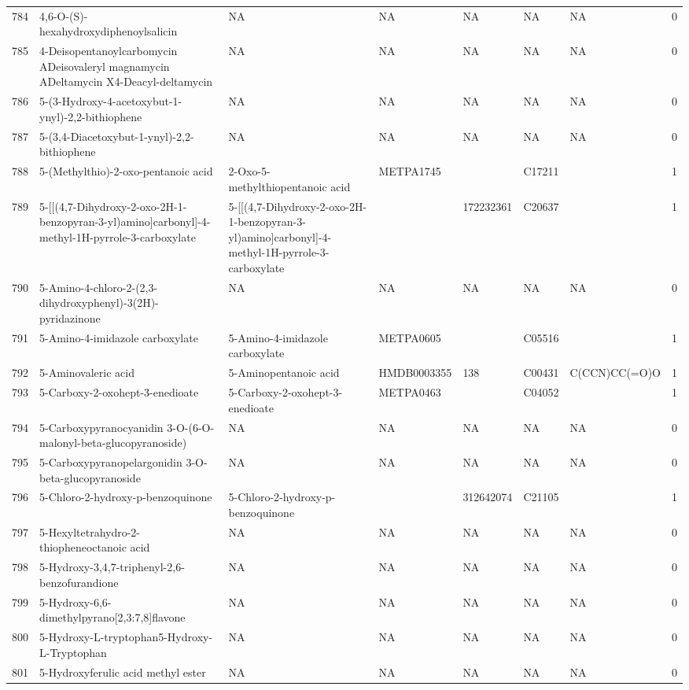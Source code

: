 \documentclass[a4paper]{article}
\begin{document}
\begin{longtable}{rlllllll}
  784 & 4,6-O-(S)-hexahydroxydiphenoylsalicin & NA & NA & NA & NA & NA & 0 \\ 
  785 & 4-Deisopentanoylcarbomycin ADeisovaleryl magnamycin ADeltamycin X4-Deacyl-deltamycin & NA & NA & NA & NA & NA & 0 \\ 
  786 & 5-(3-Hydroxy-4-acetoxybut-1-ynyl)-2,2-bithiophene & NA & NA & NA & NA & NA & 0 \\ 
  787 & 5-(3,4-Diacetoxybut-1-ynyl)-2,2-bithiophene & NA & NA & NA & NA & NA & 0 \\ 
  788 & 5-(Methylthio)-2-oxo-pentanoic acid & 2-Oxo-5-methylthiopentanoic acid & METPA1745 &  & C17211 &  & 1 \\ 
  789 & 5-[[(4,7-Dihydroxy-2-oxo-2H-1-benzopyran-3-yl)amino]carbonyl]-4-methyl-1H-pyrrole-3-carboxylate & 5-[[(4,7-Dihydroxy-2-oxo-2H-1-benzopyran-3-yl)amino]carbonyl]-4-methyl-1H-pyrrole-3-carboxylate &  & 172232361 & C20637 &  & 1 \\ 
  790 & 5-Amino-4-chloro-2-(2,3-dihydroxyphenyl)-3(2H)-pyridazinone & NA & NA & NA & NA & NA & 0 \\ 
  791 & 5-Amino-4-imidazole carboxylate & 5-Amino-4-imidazole carboxylate & METPA0605 &  & C05516 &  & 1 \\ 
  792 & 5-Aminovaleric acid & 5-Aminopentanoic acid & HMDB0003355 & 138 & C00431 & C(CCN)CC(=O)O & 1 \\ 
  793 & 5-Carboxy-2-oxohept-3-enedioate & 5-Carboxy-2-oxohept-3-enedioate & METPA0463 &  & C04052 &  & 1 \\ 
  794 & 5-Carboxypyranocyanidin 3-O-(6-O-malonyl-beta-glucopyranoside) & NA & NA & NA & NA & NA & 0 \\ 
  795 & 5-Carboxypyranopelargonidin 3-O-beta-glucopyranoside & NA & NA & NA & NA & NA & 0 \\ 
  796 & 5-Chloro-2-hydroxy-p-benzoquinone & 5-Chloro-2-hydroxy-p-benzoquinone &  & 312642074 & C21105 &  & 1 \\ 
  797 & 5-Hexyltetrahydro-2-thiopheneoctanoic acid & NA & NA & NA & NA & NA & 0 \\ 
  798 & 5-Hydroxy-3,4,7-triphenyl-2,6-benzofurandione & NA & NA & NA & NA & NA & 0 \\ 
  799 & 5-Hydroxy-6,6-dimethylpyrano[2,3:7,8]flavone & NA & NA & NA & NA & NA & 0 \\ 
  800 & 5-Hydroxy-L-tryptophan5-Hydroxy-L-Tryptophan & NA & NA & NA & NA & NA & 0 \\ 
  801 & 5-Hydroxyferulic acid methyl ester & NA & NA & NA & NA & NA & 0 \\ 

\end{longtable}
\end{document}
